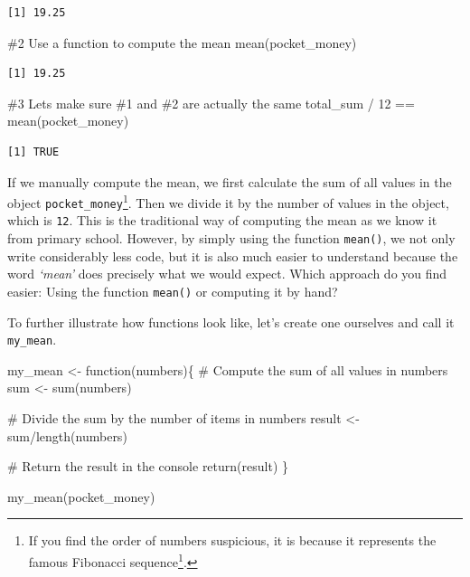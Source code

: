\documentclass[
  letterpaper,
]{krantz}
\makeatletter
\newenvironment{Shaded}{\begin{snugshade}}{\end{snugshade}}
\newcommand{\CommentTok}[1]{\textcolor[rgb]{0.37,0.37,0.37}{#1}}
\newcommand{\ControlFlowTok}[1]{\textcolor[rgb]{0.00,0.23,0.31}{#1}}
\newcommand{\DecValTok}[1]{\textcolor[rgb]{0.68,0.00,0.00}{#1}}
\newcommand{\FunctionTok}[1]{\textcolor[rgb]{0.28,0.35,0.67}{#1}}
\newcommand{\NormalTok}[1]{\textcolor[rgb]{0.00,0.23,0.31}{#1}}
\newcommand{\OtherTok}[1]{\textcolor[rgb]{0.00,0.23,0.31}{#1}}
\newcommand{\SpecialCharTok}[1]{\textcolor[rgb]{0.37,0.37,0.37}{#1}}
\renewcommand{\href}[2]{#2\footnote{\url{#1}}}
\newenvironment{kframe}{%
\medskip{}
\setlength{\fboxsep}{.8em}
 \def\at@end@of@kframe{}%
 \ifinner\ifhmode%
  \def\at@end@of@kframe{\end{minipage}}%
  \begin{minipage}{\columnwidth}%
 \fi\fi%
 \def\FrameCommand##1{\hskip\@totalleftmargin \hskip-\fboxsep
 \colorbox{shadecolor}{##1}\hskip-\fboxsep
     \hskip-\linewidth \hskip-\@totalleftmargin \hskip\columnwidth}%
 \MakeFramed {\advance\hsize-\width
   \@totalleftmargin\z@ \linewidth\hsize
   \@setminipage}}%
 {\par\unskip\endMakeFramed%
 \at@end@of@kframe}
\renewenvironment{Shaded}{\begin{kframe}}{\end{kframe}}
\makeatother
\begin{document}
\begin{verbatim}
[1] 19.25
\end{verbatim}

\begin{Shaded}
\begin{Highlighting}[]
\CommentTok{\#2 Use a function to compute the mean}
\FunctionTok{mean}\NormalTok{(pocket\_money)}
\end{Highlighting}
\end{Shaded}

\begin{verbatim}
[1] 19.25
\end{verbatim}

\begin{Shaded}
\begin{Highlighting}[]
\CommentTok{\#3 Let\textquotesingle{}s make sure \#1 and \#2 are actually the same}
\NormalTok{total\_sum }\SpecialCharTok{/} \DecValTok{12} \SpecialCharTok{==} \FunctionTok{mean}\NormalTok{(pocket\_money)}
\end{Highlighting}
\end{Shaded}

\begin{verbatim}
[1] TRUE
\end{verbatim}

If we manually compute the mean, we first calculate the sum of all
values in the object \texttt{pocket\_money}\footnote{If you find the
  order of numbers suspicious, it is because it represents the famous
  \href{https://en.wikipedia.org/wiki/Fibonacci_number}{Fibonacci
  sequence}.}. Then we divide it by the number of values in the object,
which is \texttt{12}. This is the traditional way of computing the mean
as we know it from primary school. However, by simply using the function
\texttt{mean()}, we not only write considerably less code, but it is
also much easier to understand because the word \emph{`mean'} does
precisely what we would expect. Which approach do you find easier: Using
the function \texttt{mean()} or computing it by hand?

To further illustrate how functions look like, let's create one
ourselves and call it \texttt{my\_mean}.

\begin{Shaded}
\begin{Highlighting}[]
\NormalTok{my\_mean }\OtherTok{\textless{}{-}} \ControlFlowTok{function}\NormalTok{(numbers)\{}
  \CommentTok{\# Compute the sum of all values in \textquotesingle{}numbers\textquotesingle{}}
\NormalTok{  sum }\OtherTok{\textless{}{-}} \FunctionTok{sum}\NormalTok{(numbers)}
  
  \CommentTok{\# Divide the sum by the number of items in \textquotesingle{}numbers\textquotesingle{}}
\NormalTok{  result }\OtherTok{\textless{}{-}}\NormalTok{ sum}\SpecialCharTok{/}\FunctionTok{length}\NormalTok{(numbers)}
  
  \CommentTok{\# Return the result in the console}
  \FunctionTok{return}\NormalTok{(result)}
\NormalTok{\}}

\FunctionTok{my\_mean}\NormalTok{(pocket\_money)}
\end{Highlighting}
\end{Shaded}
\end{document}
